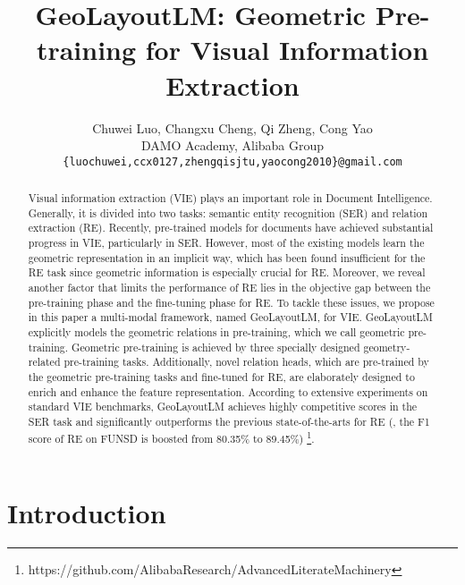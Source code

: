 \documentclass[10pt,twocolumn,letterpaper]{article}
\begin{document}
\title{GeoLayoutLM: Geometric Pre-training for Visual Information Extraction}

\author{
Chuwei Luo, 
Changxu Cheng, 
Qi Zheng, 
Cong Yao \\
DAMO Academy, Alibaba Group\\
{\tt\small \{luochuwei,ccx0127,zhengqisjtu,yaocong2010\}@gmail.com}
}
\maketitle
\def\thefootnote{*}
\def\thefootnote{\arabic{footnote}}


\begin{abstract}
  Visual information extraction (VIE) plays an important role in Document Intelligence. Generally, it is divided into two tasks: semantic entity recognition (SER) and relation extraction (RE). Recently, pre-trained models for documents have achieved substantial progress in VIE, particularly in SER. However, most of the existing models learn the geometric representation in an implicit way, which has been found insufficient for the RE task since geometric information is especially crucial for RE. Moreover, we reveal another factor that limits the performance of RE lies in the objective gap between the pre-training phase and the fine-tuning phase for RE. To tackle these issues, we propose in this paper a multi-modal framework, named GeoLayoutLM, for VIE. GeoLayoutLM explicitly models the geometric relations in pre-training, which we call geometric pre-training. Geometric pre-training is achieved by three specially designed geometry-related pre-training tasks. Additionally, novel relation heads, which are pre-trained by the geometric pre-training tasks and fine-tuned for RE, are elaborately designed to enrich and enhance the feature representation.
  According to extensive experiments on standard VIE benchmarks, GeoLayoutLM achieves highly competitive scores in the SER task and significantly outperforms the previous state-of-the-arts for RE (\eg, the F1 score of RE on FUNSD is boosted from 80.35\% to 89.45\%)
  \footnote{https://github.com/AlibabaResearch/AdvancedLiterateMachinery}.
\end{abstract}

\section{Introduction}
\label{sec:intro}
\end{document}
